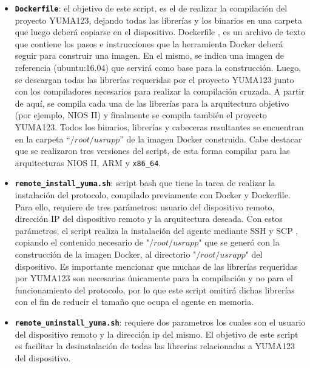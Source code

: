   \begin{itemize}
	\item \textbf{\texttt{Dockerfile}}: el objetivo de este script, es el de realizar la compilación del proyecto YUMA123, dejando todas las librerías y los binarios en una carpeta que luego deberá copiarse en el dispositivo. Dockerfile \parencite{dockerfile}, es un archivo de texto que contiene los pasos e instrucciones que la herramienta Docker deberá seguir para construir una imagen. En el mismo, se indica una imagen de referencia (ubuntu:16.04) que servirá como base para la construcción. Luego, se descargan todas las librerías requeridas por el proyecto YUMA123 junto con los compiladores necesarios para realizar la compilación cruzada. A partir de aquí, se compila cada una de las librerías para la arquitectura objetivo (por ejemplo, NIOS II) y finalmente se compila también el proyecto YUMA123. Todos los binarios, librerías y cabeceras resultantes se encuentran en la carpeta “$/root/usrapp$” de la imagen Docker construida. Cabe destacar que se realizaron tres versiones del script, de esta forma compilar para las arquitecturas NIOS II, ARM y \texttt{x86\_64}.
    
    \item \textbf{\texttt{remote\_install\_yuma.sh}}: script bash que tiene la tarea de realizar la instalación del protocolo, compilado previamente con Docker y Dockerfile. Para ello, requiere de tres parámetros: usuario del dispositivo remoto, dirección IP del dispositivo remoto y la arquitectura deseada. Con estos parámetros, el script realiza la instalación del agente mediante SSH y SCP \parencite{scpman}, copiando el contenido necesario de "$/root/usrapp$" que se generó con la construcción de la imagen Docker, al directorio "$/root/usrapp$" del dispositivo. Es importante mencionar que muchas de las librerías requeridas por YUMA123 son necesarias únicamente para la compilación y no para el funcionamiento del protocolo, por lo que este script omitirá dichas librerías con el fin de reducir el tamaño que ocupa el agente en memoria.
    
    \item \textbf{\texttt{remote\_uninstall\_yuma.sh}}: requiere dos parametros los cuales son el usuario del dispositivo remoto y la dirección ip del mismo. El objetivo de este script es facilitar la desinstalación de todas las librerías relacionadas a YUMA123 del dispositivo.

\end{itemize}


